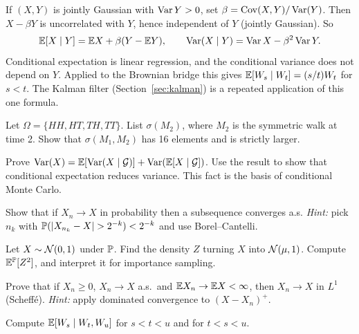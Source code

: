 \begin{example}\label{ex:gauss}
If $(X,Y)$ is jointly Gaussian with $\operatorname{Var} Y>0$, set $\beta=\operatorname{Cov}(X,Y)/\operatorname{Var}(Y)$. Then $X-\beta Y$ is uncorrelated with $Y$, hence independent of $Y$ (jointly Gaussian). So
\[
\mathbb{E}[X\mid Y]=\mathbb{E} X+\beta(Y-\mathbb{E} Y),\qquad \operatorname{Var}(X\mid Y)=\operatorname{Var} X-\beta^2\operatorname{Var} Y.
\]
Conditional expectation is linear regression, and the conditional variance does not depend on $Y$. Applied to the Brownian bridge this gives $\mathbb{E}[W_s\mid W_t]=(s/t)W_t$ for $s<t$. The Kalman filter (Section~\ref{sec:kalman}) is a repeated application of this one formula.
\end{example}

\begin{exercises}
\item Let $\Omega=\{HH,HT,TH,TT\}$. List $\sigma(M_2)$, where $M_2$ is the symmetric walk at time 2. Show that $\sigma(M_1,M_2)$ has 16 elements and is strictly larger.
\item Prove $\operatorname{Var}(X)=\mathbb{E}[\operatorname{Var}(X\mid\mathcal{G})]+\operatorname{Var}(\mathbb{E}[X\mid\mathcal{G}])$. Use the result to show that conditional expectation reduces variance. This fact is the basis of conditional Monte Carlo.
\item Show that if $X_n\to X$ in probability then a subsequence converges a.s. \emph{Hint:} pick $n_k$ with $\Prob(|X_{n_k}-X|>2^{-k})<2^{-k}$ and use Borel--Cantelli.
\item Let $X\sim\mathcal{N}(0,1)$ under $\mathbb{P}$. Find the density $Z$ turning $X$ into $\mathcal{N}(\mu,1)$. Compute $\mathbb{E}^{\mathbb{P}}[Z^2]$, and interpret it for importance sampling.
\item Prove that if $X_n\ge0$, $X_n\to X$ a.s.\ and $\mathbb{E} X_n\to\mathbb{E} X<\infty$, then $X_n\to X$ in $L^1$ (Scheff\'e). \emph{Hint:} apply dominated convergence to $(X-X_n)^+$.
\item Compute $\mathbb{E}[W_s\mid W_t,W_u]$ for $s<t<u$ and for $t<s<u$.
\end{exercises}
